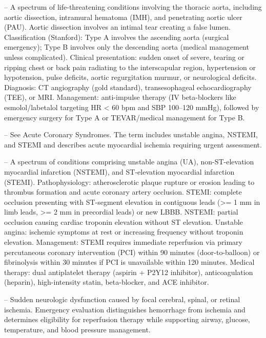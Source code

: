 -- A spectrum of life-threatening conditions involving the thoracic aorta, including aortic dissection, intramural hematoma (IMH), and penetrating aortic ulcer (PAU). Aortic dissection involves an intimal tear creating a false lumen. Classification (Stanford): Type A involves the ascending aorta (surgical emergency); Type B involves only the descending aorta (medical management unless complicated). Clinical presentation: sudden onset of severe, tearing or ripping chest or back pain radiating to the interscapular region, hypertension or hypotension, pulse deficits, aortic regurgitation murmur, or neurological deficits. Diagnosis: CT angiography (gold standard), transesophageal echocardiography (TEE), or MRI. Management: anti-impulse therapy (IV beta-blockers like esmolol/labetalol targeting HR < 60 bpm and SBP 100--120 mmHg), followed by emergency surgery for Type A or TEVAR/medical management for Type B.

-- See Acute Coronary Syndromes. The term includes unstable angina, NSTEMI, and STEMI and describes acute myocardial ischemia requiring urgent assessment.

-- A spectrum of conditions comprising unstable angina (UA), non-ST-elevation myocardial infarction (NSTEMI), and ST-elevation myocardial infarction (STEMI). Pathophysiology: atherosclerotic plaque rupture or erosion leading to thrombus formation and acute coronary artery occlusion. STEMI: complete occlusion presenting with ST-segment elevation in contiguous leads (>= 1 mm in limb leads, >= 2 mm in precordial leads) or new LBBB. NSTEMI: partial occlusion causing cardiac troponin elevation without ST elevation. Unstable angina: ischemic symptoms at rest or increasing frequency without troponin elevation. Management: STEMI requires immediate reperfusion via primary percutaneous coronary intervention (PCI) within 90 minutes (door-to-balloon) or fibrinolysis within 30 minutes if PCI is unavailable within 120 minutes. Medical therapy: dual antiplatelet therapy (aspirin + P2Y12 inhibitor), anticoagulation (heparin), high-intensity statin, beta-blocker, and ACE inhibitor.

-- Sudden neurologic dysfunction caused by focal cerebral, spinal, or retinal ischemia. Emergency evaluation distinguishes hemorrhage from ischemia and determines eligibility for reperfusion therapy while supporting airway, glucose, temperature, and blood pressure management.

